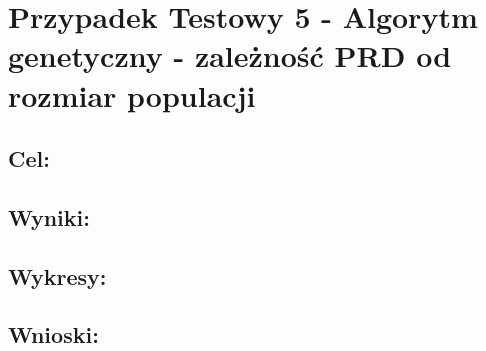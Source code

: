 \section{Przypadek Testowy 5 - Algorytm genetyczny - zależność PRD od rozmiar populacji}
  \subsection{Cel:}
  \subsection{Wyniki: }
  \subsection{Wykresy: }
  \subsection{Wnioski: }